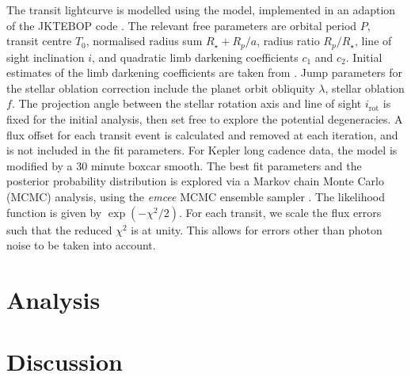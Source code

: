 \documentclass[apjl]{emulateapj}
\begin{document}
The transit lightcurve is modelled using the
\citet{1972ApJ...174..617N} model, implemented in an adaption of the
JKTEBOP code \citep{1981AJ.....86..102P,2004MNRAS.351.1277S}. The
relevant free parameters are orbital period $P$, transit centre $T_0$,
normalised radius sum $R_\star+R_p / a$, radius ratio $R_p/R_\star$,
line of sight inclination $i$, and quadratic limb darkening
coefficients $c_1$ and $c_2$. Initial estimates of the limb darkening
coefficients are taken from \citet{2010A&amp;A...510A..21S}. Jump
parameters for the stellar oblation correction include the planet
orbit obliquity $\lambda$, stellar oblation $f$. The projection angle
between the stellar rotation axis and line of sight $i_\text{rot}$ is
fixed for the initial analysis, then set free to explore the potential
degeneracies. A flux offset for each transit event is calculated and
removed at each iteration, and is not included in the fit
parameters. For Kepler long cadence data, the model is modified by a
30 minute boxcar smooth. The best fit parameters and the posterior
probability distribution is explored via a Markov chain Monte Carlo
(MCMC) analysis, using the \emph{emcee} MCMC ensemble sampler
\citep{2012arXiv1202.3665F}. The likelihood function is given by
$\exp(-\chi^2/2)$. For each transit, we scale the flux errors such
that the reduced $\chi^2$ is at unity. This allows for errors other
than photon noise to be taken into account.




\section{Analysis}
\label{sec:analysis}

\section{Discussion}
\label{sec:discussion}



\end{document}
